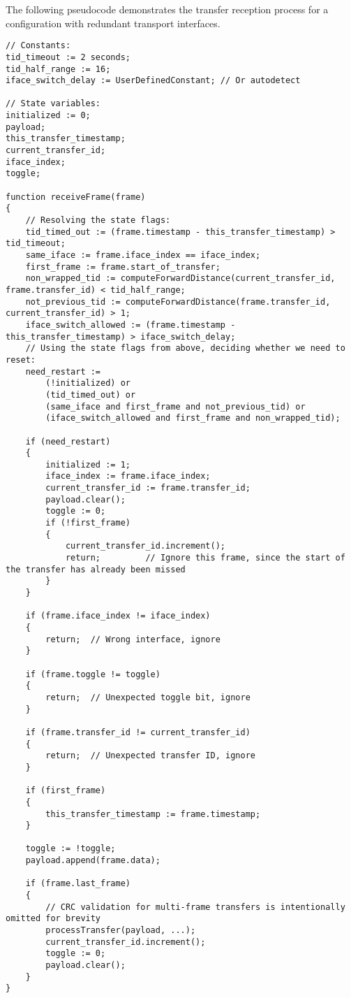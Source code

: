 The following pseudocode demonstrates the transfer reception process
for a configuration with redundant transport interfaces.

\clearpage
\begin{verbatim}
// Constants:
tid_timeout := 2 seconds;
tid_half_range := 16;
iface_switch_delay := UserDefinedConstant; // Or autodetect

// State variables:
initialized := 0;
payload;
this_transfer_timestamp;
current_transfer_id;
iface_index;
toggle;

function receiveFrame(frame)
{
    // Resolving the state flags:
    tid_timed_out := (frame.timestamp - this_transfer_timestamp) > tid_timeout;
    same_iface := frame.iface_index == iface_index;
    first_frame := frame.start_of_transfer;
    non_wrapped_tid := computeForwardDistance(current_transfer_id, frame.transfer_id) < tid_half_range;
    not_previous_tid := computeForwardDistance(frame.transfer_id, current_transfer_id) > 1;
    iface_switch_allowed := (frame.timestamp - this_transfer_timestamp) > iface_switch_delay;
    // Using the state flags from above, deciding whether we need to reset:
    need_restart :=
        (!initialized) or
        (tid_timed_out) or
        (same_iface and first_frame and not_previous_tid) or
        (iface_switch_allowed and first_frame and non_wrapped_tid);

    if (need_restart)
    {
        initialized := 1;
        iface_index := frame.iface_index;
        current_transfer_id := frame.transfer_id;
        payload.clear();
        toggle := 0;
        if (!first_frame)
        {
            current_transfer_id.increment();
            return;         // Ignore this frame, since the start of the transfer has already been missed
        }
    }

    if (frame.iface_index != iface_index)
    {
        return;  // Wrong interface, ignore
    }

    if (frame.toggle != toggle)
    {
        return;  // Unexpected toggle bit, ignore
    }

    if (frame.transfer_id != current_transfer_id)
    {
        return;  // Unexpected transfer ID, ignore
    }

    if (first_frame)
    {
        this_transfer_timestamp := frame.timestamp;
    }

    toggle := !toggle;
    payload.append(frame.data);

    if (frame.last_frame)
    {
        // CRC validation for multi-frame transfers is intentionally omitted for brevity
        processTransfer(payload, ...);
        current_transfer_id.increment();
        toggle := 0;
        payload.clear();
    }
}
\end{verbatim}

